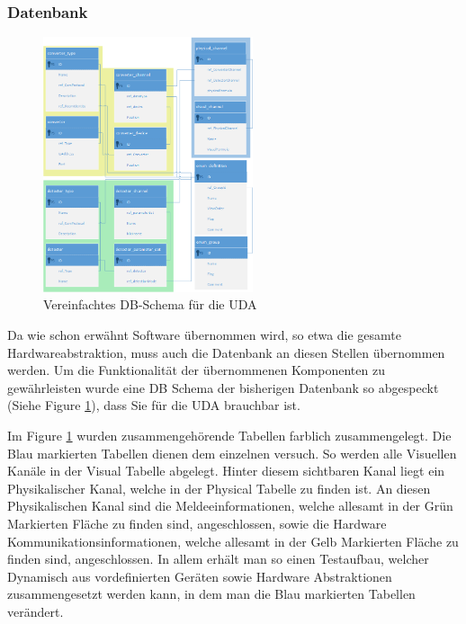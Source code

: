 \documentclass[10pt]{scrartcl}
\begin{document}
\subsubsection{Datenbank}
\begin{figure}
	\begin{center}
		\includegraphics[width=0.55\textwidth]{DBShemaEasy2.png}
		\caption{Vereinfachtes DB-Schema für die UDA}
		\label{fig:DBSchemaUDA}
	\end{center}
\end{figure}

Da wie schon erwähnt Software übernommen wird, so etwa die gesamte Hardwareabstraktion, muss auch die Datenbank an diesen Stellen übernommen werden. Um die Funktionalität der übernommenen Komponenten zu gewährleisten wurde eine DB Schema der bisherigen Datenbank so abgespeckt (Siehe Figure \ref{fig:DBSchemaUDA}), dass Sie für die UDA brauchbar ist.


Im Figure \ref{fig:DBSchemaUDA} wurden zusammengehörende Tabellen farblich zusammengelegt. Die Blau markierten Tabellen dienen dem einzelnen versuch. So werden alle Visuellen Kanäle in der Visual Tabelle abgelegt. Hinter diesem sichtbaren Kanal liegt ein Physikalischer Kanal, welche in der Physical Tabelle zu finden ist. An diesen Physikalischen Kanal sind die Meldeeinformationen, welche allesamt in der Grün Markierten Fläche zu finden sind, angeschlossen, sowie die Hardware Kommunikationsinformationen, welche allesamt in der Gelb Markierten Fläche zu finden sind, angeschlossen. In allem erhält man so einen Testaufbau, welcher Dynamisch aus vordefinierten Geräten sowie Hardware Abstraktionen zusammengesetzt werden kann, in dem man die Blau markierten Tabellen verändert.
\end{document}
